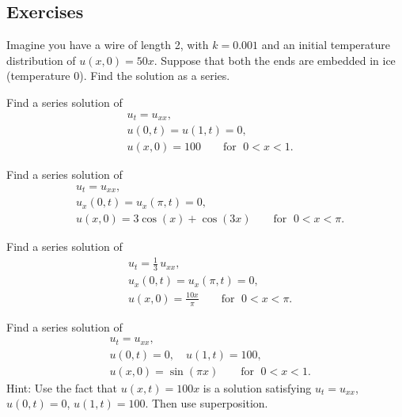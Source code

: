 
\subsection{Exercises}

\begin{exercise}
Imagine you have a wire of length 2, with $k=0.001$ and an initial
temperature distribution of $u(x,0) = 50 x$.  Suppose that both the ends
are embedded in ice (temperature 0).  Find the solution as a series.
\end{exercise}

\begin{exercise}
Find a series solution of
\begin{align*}
& u_t =  u_{xx} , \\
& u(0,t) = u(1,t) = 0 , \\
& u(x,0) = 100 \qquad \text{for } \; 0 < x < 1 .
\end{align*}
\end{exercise}

\begin{exercise}
Find a series solution of
\begin{align*}
& u_t =  u_{xx} , \\
& u_x(0,t) = u_x(\pi,t) = 0 , \\
& u(x,0) = 3\cos (x) + \cos (3x) \qquad \text{for } \; 0 < x < \pi .
\end{align*}
\end{exercise}

\begin{exercise} \label{heat:cosexr}
Find a series solution of
\begin{align*}
& u_t = \frac{1}{3} \, u_{xx} , \\
& u_x(0,t) = u_x(\pi,t) = 0 , \\
& u(x,0) = \frac{10x}{\pi} \qquad \text{for } \; 0 < x < \pi .
\end{align*}
\end{exercise}

\begin{exercise} \label{heat:oneto100exr}
Find a series solution of
\begin{align*}
& u_t =  u_{xx} , \\
& u(0,t) = 0 , \quad u(1,t) = 100 , \\
& u(x,0) = \sin (\pi x) \qquad \text{for } \; 0 < x < 1 .
\end{align*}
Hint: Use the fact that $u(x,t) = 100 x$ is a solution satisfying
$u_t = u_{xx}$, $u(0,t) = 0$, $u(1,t) = 100$.  Then use superposition.
\end{exercise}

